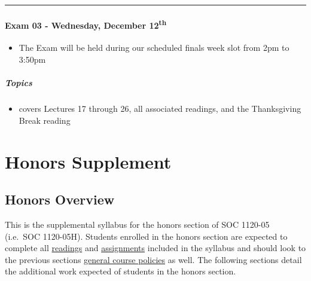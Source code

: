 \documentclass[]{book}
\providecommand{\tightlist}{%
  \setlength{\itemsep}{0pt}\setlength{\parskip}{0pt}}
\newenvironment{rmdblock}[1]
  {\begin{shaded*}
  \begin{itemize}
  \renewcommand{\labelitemi}{
    \raisebox{-.7\height}[0pt][0pt]{
      {\setkeys{Gin}{width=3em,keepaspectratio}\texttt{[image: images/\#1]}}
    }
  }
  \item
  }
  {
  \end{itemize}
  \end{shaded*}
  }
\newenvironment{rmdwarning}
  {\begin{rmdblock}{warning}}
  {\end{rmdblock}}
\theoremstyle{definition}
\theoremstyle{definition}
\theoremstyle{definition}
\theoremstyle{remark}
\begin{document}
\begin{center}\rule{0.5\linewidth}{\linethickness}\end{center}

\hypertarget{exam-03---wednesday-december-12th}{%
\subsection*{\texorpdfstring{Exam 03 - Wednesday, December
12\textsuperscript{th}}{Exam 03 - Wednesday, December 12th}}\label{exam-03---wednesday-december-12th}}

\begin{rmdwarning}
The Exam will be held during our scheduled finals week slot from 2pm to
3:50pm
\end{rmdwarning}

\hypertarget{topics-31}{%
\subsubsection*{Topics}\label{topics-31}}

\begin{itemize}
\tightlist
\item
  covers Lectures 17 through 26, all associated readings, and the
  Thanksgiving Break reading
\end{itemize}

\hypertarget{part-honors-supplement}{%
\part{Honors Supplement}\label{part-honors-supplement}}

\hypertarget{honors-overview}{%
\chapter{Honors Overview}\label{honors-overview}}

This is the supplemental syllabus for the honors section of SOC 1120-05
(i.e.~SOC 1120-05H). Students enrolled in the honors section are
expected to complete all \href{/lecture-schedule.html}{readings} and
\href{/assignments-and-grading.html}{assignments} included in the
syllabus and should look to the previous sections
\href{/course-policies.html}{general course policies} as well. The
following sections detail the additional work expected of students in
the honors section.
\end{document}
